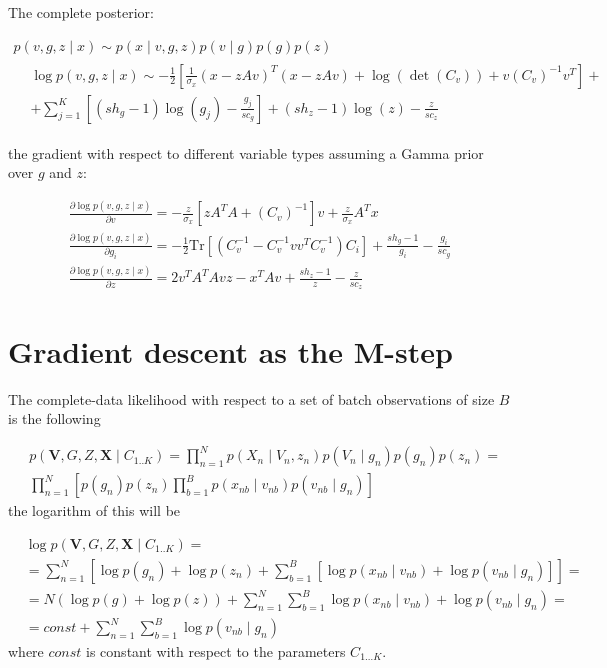 \documentclass{paper}
\begin{document}
The complete posterior:

\begin{eqnarray}
p(v,g,z \mid x) \sim p(x \mid v,g,z) p(v \mid g) p(g) p(z) \\
\begin{split}
& \log p(v,g,z \mid x) \sim -\frac{1}{2} \left[ \frac{1}{\sigma_x} (x - zAv)^T (x - zAv) + \log \left( \det \left( C_v \right) \right) + v \left(C_v \right)^{-1} v^T \right] + \\
& + \sum_{j=1}^K \left[ (sh_g - 1) \log(g_j) - \frac{g_j}{sc_g} \right] + (sh_z - 1) \log(z) - \frac{z}{sc_z}
\end{split}
\end{eqnarray}

the gradient with respect to different variable types assuming a Gamma prior over $g$ and $z$:

\begin{eqnarray}
\frac{\partial \log p(v,g,z \mid x)}{\partial v} = - \frac{z}{\sigma_x} \left[ zA^TA + \left( C_v \right)^{-1} \right] v + \frac{z}{\sigma_x} A^T x \\
\frac{\partial \log p(v,g,z \mid x)}{\partial g_i} = -\frac{1}{2} \textrm{Tr} \left[ \left( C_v^{-1} - C_v^{-1} v v^T C_v^{-1} \right) C_i \right] + \frac{sh_g - 1}{g_i} - \frac{g_i}{sc_g} \\
\frac{\partial \log p(v,g,z \mid x)}{\partial z} = 2v^TA^TAvz -x^TAv + \frac{sh_z - 1}{z} - \frac{z}{sc_z}
\end{eqnarray}


\section{Gradient descent as the M-step}

The complete-data likelihood with respect to a set of batch observations of size $B$ is the following

\begin{equation}
\begin{split}
&p(\mathbf{V},G,Z,\mathbf{X} \mid C_{1..K}) = \prod_{n=1}^N p(X_n \mid V_n,z_n) p(V_n \mid g_n) p(g_n)  p(z_n)= \\
&\prod_{n=1}^N \left[ p(g_n) p(z_n) \prod_{b=1}^B p(x_{nb} \mid v_{nb}) p(v_{nb} \mid g_n) \right]
\end{split}
\end{equation}
%
the logarithm of this will be

\begin{equation}
\begin{split}
& \log p(\mathbf{V},G,Z,\mathbf{X} \mid C_{1..K} )= \\ 
& = \sum_{n=1}^N  \left[ \log p(g_n) + \log p(z_n) + \sum_{b=1}^B  \left[ \log p(x_{nb} \mid v_{nb}) + \log p(v_{nb} \mid g_n)\right] \right] = \\
& = N  (\log p(g) + \log p(z)) + \sum_{n=1}^N \sum_{b=1}^B \log p(x_{nb} \mid v_{nb}) + \log p(v_{nb} \mid g_n) = \\
& = const + \sum_{n=1}^N \sum_{b=1}^B  \log p(v_{nb} \mid g_n)
\end{split}
\end{equation}
%
where $const$ is constant with respect to the parameters $C_{1 \dots K}$.
\end{document}
